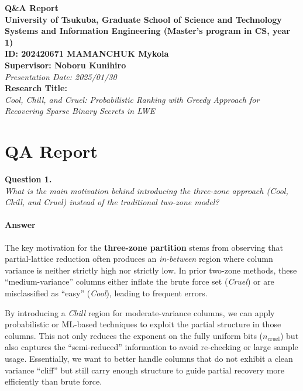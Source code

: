 \documentclass[12pt]{article}
\begin{document}
\begin{center}
{\large \textbf{Q\&A Report}}\\[6pt]
\textbf{University of Tsukuba, Graduate School of Science and Technology}\\
\textbf{Systems and Information Engineering (Master's program in CS, year 1)}\\[5pt]
\textbf{ID: 202420671 \quad MAMANCHUK Mykola}\\
\textbf{Supervisor: Noboru Kunihiro}\\[4pt]
\textit{Presentation Date: 2025/01/30}\\[8pt]

\textbf{Research Title:}\\
\textit{Cool, Chill, and Cruel: Probabilistic Ranking with Greedy Approach for Recovering Sparse Binary Secrets in LWE}
\end{center}

\vspace{1em}

\section*{QA Report}

\noindent
\textbf{Question 1.}\\
\emph{What is the main motivation behind introducing the three-zone approach (Cool, Chill, and Cruel) instead of the traditional two-zone model?}

\paragraph{Answer}
The key motivation for the \textbf{three-zone partition} stems from observing that partial-lattice reduction often produces an \emph{in-between} region where column variance is neither strictly high nor strictly low. In prior two-zone methods, these “medium-variance” columns either inflate the brute force set (\textit{Cruel}) or are misclassified as “easy” (\textit{Cool}), leading to frequent errors. 

By introducing a \emph{Chill} region for moderate-variance columns, we can apply probabilistic or ML-based techniques to exploit the partial structure in those columns. This not only reduces the exponent on the fully uniform bits (\(n_{\mathrm{cruel}}\)) but also captures the “semi-reduced” information to avoid re-checking or large sample usage. Essentially, we want to better handle columns that do not exhibit a clean variance “cliff” but still carry enough structure to guide partial recovery more efficiently than brute force.
\end{document}
